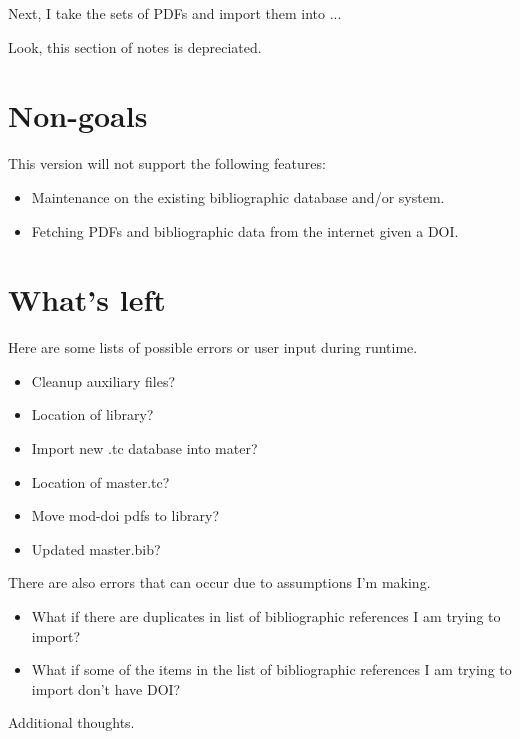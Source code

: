 \documentclass[letterpaper,12pt]{article}
\begin{document}
Next, I take the sets of PDFs and import them into ...

Look, this section of notes is depreciated.

\section{Non-goals}
This version will not support the following features:

\begin{itemize}
\item Maintenance on the existing bibliographic database and/or system.
\item Fetching PDFs and bibliographic data from the internet given a DOI.
\end{itemize}

\section{What's left}
Here are some lists of possible errors or user input during runtime.

\begin{itemize}
\item Cleanup auxiliary files?
\item Location of library?
\item Import new .tc database into mater?
\item Location of master.tc?
\item Move mod-doi pdfs to library?
\item Updated master.bib?
\end{itemize}

There are also errors that can occur due to assumptions I'm making.

\begin{itemize}
\item What if there are duplicates in list of bibliographic references I am trying to import?
\item What if some of the items in the list of bibliographic references I am trying to import don't have DOI?
\end{itemize}

Additional thoughts.
\end{document}
